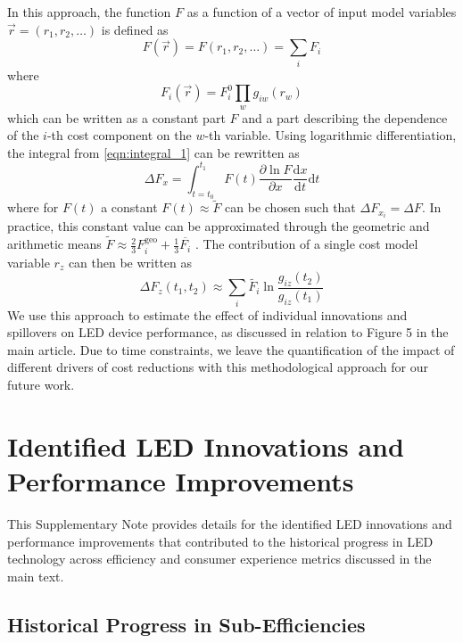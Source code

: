 \documentclass[parskip=full]{article}
\begin{document}
In this approach, the function $F$ as a function of a vector of input model variables $\vec{r}=(r_1,r_2,\dots)$ is defined as
%
\begin{equation}
    F(\vec{r}) = F(r_1,r_2, \dots) = \sum_i F_i
\end{equation}
where
\begin{equation}
    F_i(\vec{r}) = F_i^0 \prod_w g_{iw}(r_w)
\end{equation}
%
which can be written as a constant part $F$ and a part describing the dependence of the $i$-th cost component on the $w$-th variable.
%
Using logarithmic differentiation, the integral from  \cref{eqn:integral_1} can be rewritten as
\begin{equation}
    \Delta F_x = \int_{t=t_0}^{t_1} F(t) \frac{ \partial \ln F }{ \partial x } \frac{ \text{d} x }{ \text{d} t} \text{d} t
\end{equation}
%
where for $F(t)$ a constant $F(t) \approx \tilde{F} $ can be chosen such that $\Delta F_{x_i} = \Delta F$. In practice, this constant value can be approximated through the geometric and arithmetic means $\tilde{F} \approx \frac{2}{3} F_i^\text{geo} + \frac{1}{3} \overline{F_i}$ \cite{kavlak2018evaluating}. The contribution of a single cost model variable $r_z$ can then be written as
%
\begin{equation}
    \Delta F_z (t_1,t_2) \approx \sum_i \tilde{F_i} \ln \frac{g_{iz}(t_2)}{g_{iz}(t_1)}
\end{equation}
%
We use this approach to estimate the effect of individual innovations and spillovers on LED device performance, as discussed in relation to Figure 5 in the main article. Due to time constraints, we leave the quantification of the impact of different drivers of cost reductions with this methodological approach for our future work.

\clearpage
\section{Identified LED Innovations and Performance Improvements}

This Supplementary Note provides details for the identified LED innovations and performance improvements that contributed to the historical progress in LED technology across efficiency and consumer experience metrics discussed in the main text.

\subsection{Historical Progress in Sub-Efficiencies}
\end{document}
